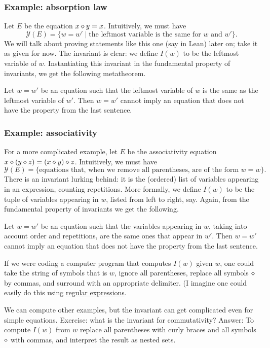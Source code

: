 \subsubsection*{Example: absorption law}
Let $E$ be the equation $x \diamond y = x$. Intuitively, we must have
\[
\mathcal{Y}(E) = \{w = w' \mid \text{the leftmost variable is the same for $w$ and $w'$}\}.
\]
We will talk about proving statements like this one (say in Lean) later on; take it as given for now. The invariant is clear: we define $I(w)$ to be the leftmost variable of $w$. Instantiating this invariant in the fundamental property of invariants, we get the following metatheorem.
\begin{metatheorem}
	Let $w = w'$ be an equation such that the leftmost variable of $w$ is the same as the leftmost variable of $w'$. Then $w = w'$ cannot imply an equation that does not have the property from the last sentence.
\end{metatheorem}

\subsubsection*{Example: associativity}
For a more complicated example, let $E$ be the associativity equation $x \diamond (y \diamond z) = (x \diamond y) \diamond z$. Intuitively, we must have
\[
\mathcal{Y}(E) = \{\text{equations that, when we remove all parentheses, are of the form $w = w$}\}.
\]
There is an invariant lurking behind: it is the (ordered) list of variables appearing in an expression, counting repetitions. More formally, we define $I(w)$ to be the tuple of variables appearing in $w$, listed from left to right, say. Again, from the fundamental property of invariants we get the following.
\begin{metatheorem}
	Let $w = w'$ be an equation such that the variables appearing in $w$, taking into account order and repetitions, are the same ones that appear in $w'$. Then $w = w'$ cannot imply an equation that does not have the property from the last sentence.
\end{metatheorem}

If we were coding a computer program that computes $I(w)$ given $w$, one could take the string of symbols that is $w$, ignore all parentheses, replace all symbols $\diamond$ by commas, and surround with an appropriate delimiter. (I imagine one could easily do this using \href{https://en.wikipedia.org/wiki/Regular_expression}{regular expressions}.

We can compute other examples, but the invariant can get complicated even for simple equations. Exercise: what is the invariant for commutativity? Answer: To compute $I(w)$ from $w$ replace all parentheses with curly braces and all symbols $\diamond$ with commas, and interpret the result as nested sets.

